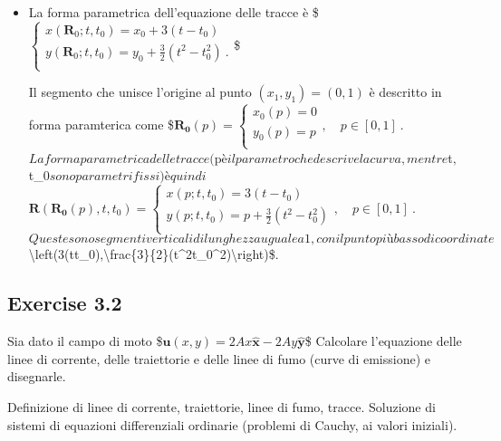 \documentclass[letterpaper,10pt,italian]{jupyterBook}
\begin{document}
\begin{itemize}
\item {} 
\sphinxAtStartPar
{} La forma parametrica dell’equazione delle tracce è
\$\(\begin{cases}
  x(\bm{R}_0;t,t_0) = x_0 + 3(t-t_0) \\
  y(\bm{R}_0;t,t_0) = y_0 +\frac{3}{2} (t^2 -t_0^2) \ . \\
 \end{cases}\)\$

\sphinxAtStartPar
Il segmento che unisce l’origine al punto \((x_1,y_1)=(0,1)\) è
descritto in forma paramterica come \$\(\bm{R_0}(p) = \begin{cases}
 x_0(p) = 0  \\
 y_0(p) = p  \\
\end{cases}  , \quad p \in [0,1] \ .\)\( La forma parametrica delle
tracce (\)p\( è il parametro che descrive la curva, mentre \)t\(, \)t\_0\(
sono parametri fissi) è quindi \)\(\bm{R}(\bm{R_0}(p),t,t_0) = 
 \begin{cases}
  x(p;t,t_0) = 3(t-t_0) \\
  y(p;t,t_0) = p +\frac{3}{2} (t^2 -t_0^2) \\
 \end{cases}  , \quad p \in [0,1] \ .\)\( Queste sono segmenti
verticali di lunghezza uguale a 1, con il punto più basso di
coordinate \)\textbackslash{}left(3(t\sphinxhyphen{}t\_0),\textbackslash{}frac\{3\}\{2\}(t\textasciicircum{}2\sphinxhyphen{}t\_0\textasciicircum{}2)\textbackslash{}right)\$.

\end{itemize}

\sphinxstepscope


\subsection{Exercise 3.2}
\label{\detokenize{polimi/fluidmechanics-ita/template/capitoli/03_cinematica/1201in:exercise-3-2}}\label{\detokenize{polimi/fluidmechanics-ita/template/capitoli/03_cinematica/1201in:fluid-mechanics-kinematics-ex-02}}\label{\detokenize{polimi/fluidmechanics-ita/template/capitoli/03_cinematica/1201in::doc}}
\sphinxAtStartPar
Sia dato il campo di moto
\$\(\bm{u}(x,y) = 2Ax \bm{\hat{x}} - 2Ay \bm{\hat{y}}\)\$ Calcolare
l’equazione delle linee di corrente, delle traiettorie e delle linee di
fumo (curve di emissione) e disegnarle.

\sphinxAtStartPar
Definizione di linee di corrente, traiettorie, linee di fumo, tracce.
Soluzione di sistemi di equazioni differenziali ordinarie (problemi di
Cauchy, ai valori iniziali).
\end{document}
